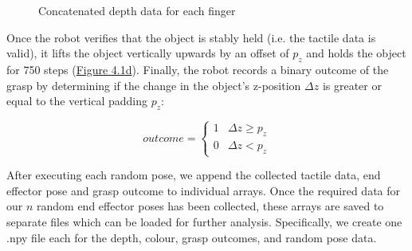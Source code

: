 \documentclass[11pt, a4paper]{report}
\begin{document}
\begin{figure}[H]%
    \centering
    \qquad
    \caption{Concatenated depth data for each finger}%
    \label{fig:4.3}%
\end{figure}

Once the robot verifies that the object is stably held (i.e. the tactile data is valid), it lifts the object vertically upwards by an offset of $p_z$ and holds the object for 750 steps (\hyperref[fig:4.1d]{Figure 4.1d}). Finally, the robot records a binary outcome of the grasp by determining if the change in the object's z-position $\Delta z$ is greater or equal to the vertical padding $p_z$:

\begin{equation}
    outcome=\begin{cases}1 & \Delta z\geq p_z \\ 0 & \Delta z<p_z\end{cases}
\end{equation}

After executing each random pose, we append the collected tactile data, end effector pose and grasp outcome to individual arrays. Once the required data for our $n$ random end effector poses has been collected, these arrays are saved to separate files which can be loaded for further analysis. Specifically, we create one .npy file each for the depth, colour, grasp outcomes, and random pose data.
\end{document}
